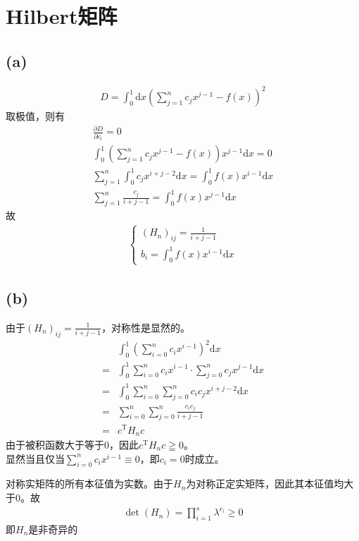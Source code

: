 \documentclass{article}
\numberwithin{equation}{section}
\begin{document}
\section{Hilbert矩阵}
\subsection*{(a)}
\begin{align}
    D=\int_0^1 \mathrm{d}x \left(\sum_{j=1}^n c_j x^{j-1}-f\left(x\right)\right)^2
\end{align}
取极值，则有
\begin{gather}
    \frac{\partial D}{\partial c_i}=0                                                         \\
    \int_0^1 \left(\sum_{j=1}^n c_j x^{j-1}-f\left(x\right)\right)x^{j-1}\mathrm{d}x=0        \\
    \sum_{j=1}^n \int_0^1 c_j x^{i+j-2}\mathrm{d}x=\int_0^1 f\left(x\right)x^{i-1}\mathrm{d}x \\
    \sum_{j=1}^n \frac{c_j}{i+j-1}=\int_0^1 f\left(x\right)x^{j-1}\mathrm{d}x
\end{gather}
故
\begin{align}
    \begin{cases}
        \left(H_{n}\right)_{ij}=\frac{1}{i+j-1} \\
        b_i=\int_0^1 f\left(x\right)x^{i-1}\mathrm{d}x
    \end{cases}
\end{align}
\subsection*{(b)}
由于$\left(H_{n}\right)_{ij}=\frac{1}{i+j-1}$，对称性是显然的。
\begin{align}
      & \int_0^1 \left(\sum_{i=0}^n c_i x^{i-1}\right)^2\mathrm{d}x                \\
    = & \int_0^1 \sum_{i=0}^n c_i x^{i-1}\cdot \sum_{j=0}^n c_j x^{j-1}\mathrm{d}x \\
    = & \int_0^1 \sum_{i=0}^n \sum_{j=0}^n c_i c_j x^{i+j-2}\mathrm{d}x            \\
    = & \sum_{i=0}^n \sum_{j=0}^n \frac{c_i c_j}{i+j-1}                            \\
    = & c^{\mathrm{T}}H_nc
\end{align}
由于被积函数大于等于0，因此$c^{\mathrm{T}}H_nc\geqq 0$。\\
显然当且仅当$\sum_{i=0}^n c_i x^{i-1}\equiv 0$，即$c_i=0$时成立。\par
对称实矩阵的所有本征值为实数。由于$H_n$为对称正定实矩阵，因此其本征值均大于0。故
\begin{align}
    \det\left(H_n\right)=\prod_{i=1}^s \lambda^{r_i}\geq 0
\end{align}
即$H_n$是非奇异的
\end{document}
